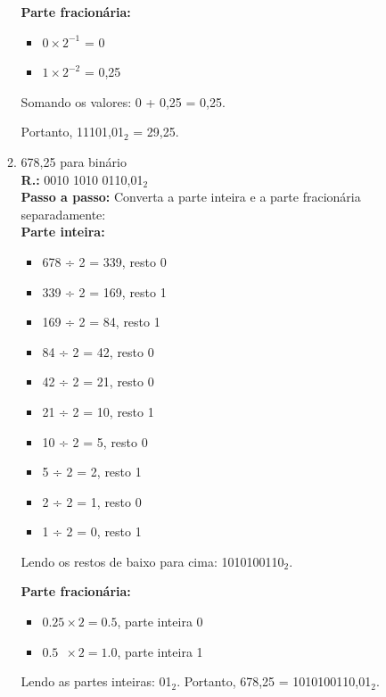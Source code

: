 \documentclass{article}[12pt]
\begin{document}
\begin{enumerate}
\begin{enumerate}
                \textbf{Parte fracionária:}
                \begin{itemize}
                    \item $0 \times 2^{-1}$ = 0
                    \item $1 \times 2^{-2}$ = 0,25
                \end{itemize}
                Somando os valores: 0 + 0,25 = 0,25.

            Portanto, 11101,01$_2$ = 29,25.

            \item 678,25 para binário \\
            \textbf{R.:} 0010 1010 0110,01$_2$ \\
            \textbf{Passo a passo:} Converta a parte inteira e a parte fracionária separadamente: \\
                \textbf{Parte inteira:}
                \begin{itemize}
                    \item 678 ÷ 2 = 339, resto 0
                    \item 339 ÷ 2 = 169, resto 1
                    \item 169 ÷ 2 = \phantom{0}84, resto 1
                    \item \phantom{0}84 ÷ 2 = \phantom{0}42, resto 0
                    \item \phantom{0}42 ÷ 2 = \phantom{0}21, resto 0
                    \item \phantom{0}21 ÷ 2 = \phantom{0}10, resto 1
                    \item \phantom{0}10 ÷ 2 = \phantom{00}5, resto 0
                    \item \phantom{00}5 ÷ 2 = \phantom{00}2, resto 1
                    \item \phantom{00}2 ÷ 2 = \phantom{00}1, resto 0
                    \item \phantom{00}1 ÷ 2 = \phantom{00}0, resto 1
                \end{itemize}
                Lendo os restos de baixo para cima: 1010100110$_2$.

                \textbf{Parte fracionária:}
                \begin{itemize}
                    \item $0.25 \times           2 = 0.5$, parte inteira 0
                    \item $0.5\phantom{0} \times 2 = 1.0$, parte inteira 1
                \end{itemize}
                Lendo as partes inteiras: 01$_2$.
            Portanto, 678,25 = 1010100110,01$_2$.


\end{enumerate}
\end{enumerate}
\end{document}
